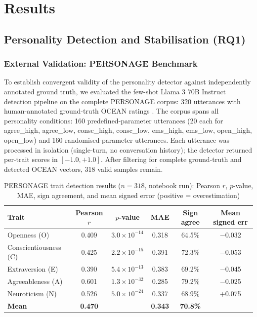 \documentclass[10pt,a4paper]{report}
\begin{document}
\chapter{Results}
\label{ch:results}

\section{Personality Detection and Stabilisation (RQ1)}

\subsection{External Validation: PERSONAGE Benchmark}

To establish convergent validity of the personality detector against independently annotated ground truth, we evaluated the few-shot Llama 3 70B Instruct detection pipeline on the complete PERSONAGE corpus: 320 utterances with human-annotated ground-truth OCEAN ratings \citep{Mairesse2011}. The corpus spans all personality conditions: 160 predefined-parameter utterances (20 each for agree\_high, agree\_low, consc\_high, consc\_low, ems\_high, ems\_low, open\_high, open\_low) and 160 randomised-parameter utterances. Each utterance was processed in isolation (single-turn, no conversation history); the detector returned per-trait scores in $[-1.0, +1.0]$. After filtering for complete ground-truth and detected OCEAN vectors, 318 valid samples remain.

\begin{table}[H]
\centering\small
\caption{PERSONAGE trait detection results ($n = 318$, notebook run): Pearson $r$, $p$-value, MAE, sign agreement, and mean signed error (positive = overestimation)}
\begin{tabular}{@{}lccccc@{}}
\toprule
Trait & Pearson $r$ & $p$-value & MAE & Sign agree & Mean signed err \\
\midrule
Openness (O)          & 0.409 & $3.0 \times 10^{-14}$ & 0.318 & 64.5\% & $-$0.032 \\
Conscientiousness (C) & 0.425 & $2.2 \times 10^{-15}$ & 0.391 & 72.3\% & $-$0.053 \\
Extraversion (E)      & 0.390 & $5.4 \times 10^{-13}$ & 0.383 & 69.2\% & $-$0.045 \\
Agreeableness (A)     & 0.601 & $1.3 \times 10^{-32}$ & 0.285 & 79.2\% & $-$0.025 \\
Neuroticism (N)       & 0.526 & $5.0 \times 10^{-24}$ & 0.337 & 68.9\% & $+$0.075 \\
\textbf{Mean}         & \textbf{0.470} & & \textbf{0.343} & \textbf{70.8\%} & \\
\bottomrule
\end{tabular}
\end{table}
\end{document}
